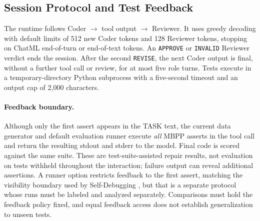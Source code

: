 \documentclass[10pt,twocolumn,letterpaper]{article}
\begin{document}
\subsection{Session Protocol and Test Feedback}
The runtime follows Coder $\rightarrow$ tool output $\rightarrow$ Reviewer.
It uses greedy decoding with default limits of 512 new Coder tokens and
128 Reviewer tokens, stopping on ChatML end-of-turn or end-of-text tokens.
An \texttt{APPROVE} or \texttt{INVALID} Reviewer verdict ends the session.
After the second \texttt{REVISE}, the next Coder output is final, without a
further tool call or review, for at most five role turns. Tests execute in a
temporary-directory Python subprocess with a five-second timeout and an
output cap of 2,000 characters.

\paragraph{Feedback boundary.}
Although only the first assert appears in the TASK text, the current data
generator and default evaluation runner execute \emph{all} MBPP asserts in
the tool call and return the resulting stdout and stderr to the model.
Final code is scored against the same suite. These are test-suite-assisted
repair results, not evaluation on tests withheld throughout the interaction;
failure output can reveal additional assertions. A runner option restricts
feedback to the first assert, matching the visibility boundary used by
Self-Debugging \cite{chen2023selfdebug}, but that is a separate protocol whose
runs must be labeled and analyzed separately. Comparisons must hold the
feedback policy fixed, and equal feedback access does not establish
generalization to unseen tests.
\end{document}
